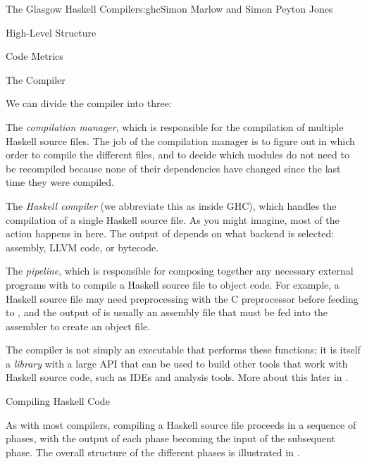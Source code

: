 \begin{aosachapter}{The Glasgow Haskell Compiler}{s:ghc}{Simon Marlow and Simon Peyton Jones}
\begin{aosasect1}{High-Level Structure}
\begin{aosasect2}{Code Metrics}
\begin{aosaitemize}
\end{aosaitemize}

\end{aosasect2}

\begin{aosasect2}{The Compiler}

We can divide the compiler into three:

\begin{aosaitemize}

\item The \emph{compilation manager}, which is responsible for the
  compilation of multiple Haskell source files.  The job of the
  compilation manager is to figure out in which order to compile the
  different files, and to decide which modules do not need to be
  recompiled because none of their dependencies have changed since the
  last time they were compiled.

\item The \emph{Haskell compiler} (we abbreviate this as 
  inside GHC), which handles the compilation of a single Haskell
  source file.  As you might imagine, most of the action happens in
  here.  The output of  depends on what backend is selected:
  assembly, LLVM code, or bytecode.

\item The \emph{pipeline}, which is responsible for composing together
  any necessary external programs with  to compile a Haskell
  source file to object code.  For example, a Haskell source file may
  need preprocessing with the C preprocessor before feeding to
  , and the output of  is usually an assembly file
  that must be fed into the assembler to create an object file.

\end{aosaitemize}

The compiler is not simply an executable that performs these
functions; it is itself a \emph{library} with a large API that can be
used to build other tools that work with Haskell source code, such as
IDEs and analysis tools.  More about this later in
.

\end{aosasect2}

\begin{aosasect2}{Compiling Haskell Code}

As with most compilers, compiling a Haskell source file proceeds in a
sequence of phases, with the output of each phase becoming the input
of the subsequent phase.  The overall structure of the different
phases is illustrated in .


\end{aosasect2}
\end{aosasect1}
\end{aosachapter}
